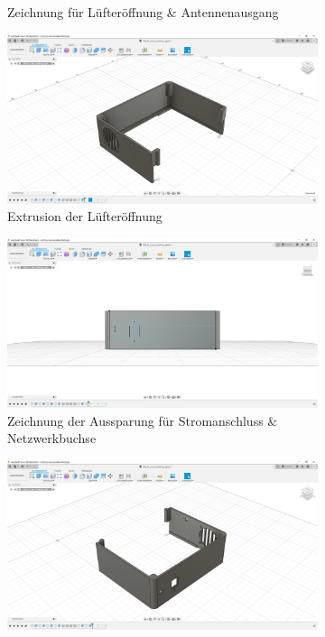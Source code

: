 \begin{figure}[H]
\begin{subfigure}[t]{.3\linewidth}
		\caption[Zeichnung für Lüfteröffnung \& Antennenausgang]{Zeichnung für Lüfteröffnung \& Antennenausgang}
		\label{fig:design-right-09}
	\end{subfigure}
	\begin{subfigure}[t]{.3\linewidth}
		\includegraphics[width=\linewidth]{img/konstruktion_gehaeuse_rechts_010.png}
		\caption[Extrusion der Lüfteröffnung]{Extrusion der Lüfteröffnung}
		\label{fig:design-right-10}
	\end{subfigure}
	\begin{subfigure}[t]{.3\linewidth}
		\includegraphics[width=\linewidth]{img/konstruktion_gehaeuse_rechts_011.png}
		\caption[Zeichnung der Aussparung für Stromanschluss \& Netzwerkbuchse]{Zeichnung der Aussparung für Stromanschluss \& Netzwerkbuchse}
		\label{fig:design-right-11}
	\end{subfigure}
	\begin{subfigure}[t]{.3\linewidth}
		\includegraphics[width=\linewidth]{img/konstruktion_gehaeuse_rechts_012.png}

\end{subfigure}
\end{figure}
